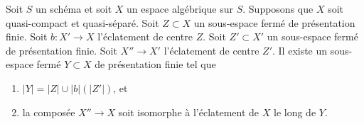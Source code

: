 \begin{lemma}
\label{lemma-composition-finite-type-blowups}
Soit $S$ un schéma et soit $X$ un espace algébrique sur $S$.
Supposons que $X$ soit quasi-compact et quasi-séparé.
Soit $Z \subset X$ un sous-espace fermé de présentation finie.
Soit $b : X' \to X$ l'éclatement de centre $Z$.
Soit $Z' \subset X'$ un sous-espace fermé de présentation finie.
Soit $X'' \to X'$ l'éclatement de centre $Z'$.
Il existe un sous-espace fermé $Y \subset X$ de présentation finie
tel que
\begin{enumerate}
\item $|Y| = |Z| \cup |b|(|Z'|)$, et
\item la composée $X'' \to X$ soit isomorphe à l'éclatement
de $X$ le long de $Y$.
\end{enumerate}
\end{lemma}

